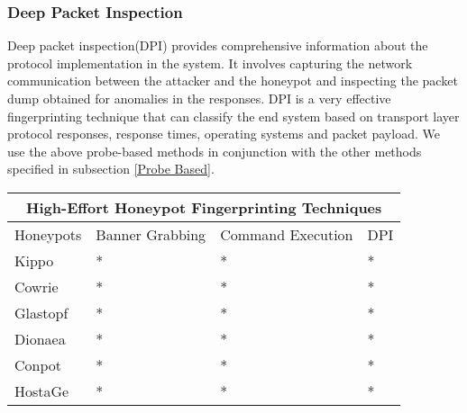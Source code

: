 \subsubsection{Deep Packet Inspection}
Deep packet inspection(DPI) provides comprehensive information about the protocol implementation in the system. It involves capturing the network communication between the attacker and the honeypot and inspecting the packet dump obtained for anomalies in the responses. DPI is a very effective fingerprinting technique that can classify the end system based on transport layer protocol responses, response times, operating systems and packet payload. We use the above probe-based methods in conjunction with the other methods specified in subsection \ref{Probe Based}.





\begin{tabular}{ |p{1.5cm}||p{1.5cm}|p{1.5cm}|p{1cm}| }
 \hline
 \multicolumn{4}{|c|}{High-Effort Honeypot Fingerprinting Techniques} \\
 \hline
 Honeypots & Banner Grabbing & Command Execution & DPI \\
 \hline
 Kippo   & *  &* & * \\
 Cowrie  & *  &* & * \\
 Glastopf& *  &* & *  \\
 Dionaea & *  &* & * \\
 Conpot  & *  &* & * \\
 HostaGe & *  &* & * \\
 \hline
\end{tabular}
